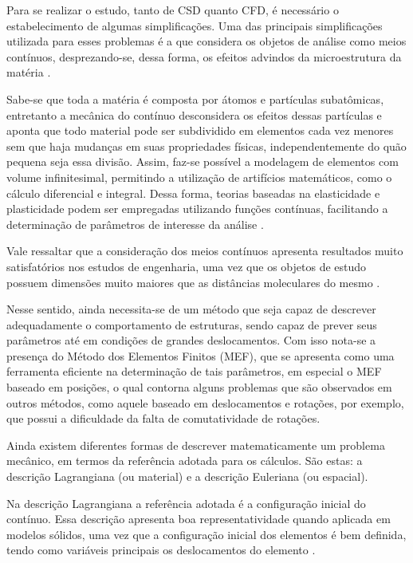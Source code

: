 \documentclass[_ArquivoPrincipal.tex]{subfiles}
\begin{document}
Para se realizar o estudo, tanto de CSD quanto CFD, é necessário o estabelecimento de algumas simplificações. Uma das principais simplificações utilizada para esses problemas é a que considera os objetos de análise como meios contínuos, desprezando-se, dessa forma, os efeitos advindos da microestrutura da matéria \cite{lai2009introduction, mase2009continuum}.

Sabe-se que toda a matéria é composta por átomos e partículas subatômicas, entretanto a mecânica do contínuo desconsidera os efeitos dessas partículas e aponta que todo material pode ser subdividido em elementos cada vez menores sem que haja mudanças em suas propriedades físicas, independentemente do quão pequena seja essa divisão. Assim, faz-se possível a modelagem de elementos com volume infinitesimal, permitindo a utilização de artifícios matemáticos, como o cálculo diferencial e integral. Dessa forma, teorias baseadas na elasticidade e plasticidade podem ser empregadas utilizando funções contínuas, facilitando a determinação de parâmetros de interesse da análise \cite{irgens2008continuum, lai2009introduction, malvern1969introduction}.

Vale ressaltar que a consideração dos meios contínuos apresenta resultados muito satisfatórios nos estudos de engenharia, uma vez que os objetos de estudo possuem dimensões muito maiores que as distâncias moleculares do mesmo \cite{malvern1969introduction, mase2009continuum}.

Nesse sentido, ainda necessita-se de um método que seja capaz de descrever adequadamente o comportamento de estruturas, sendo capaz de prever seus parâmetros até em condições de grandes deslocamentos. Com isso nota-se a presença do Método dos Elementos Finitos (MEF), que se apresenta como uma ferramenta eficiente na determinação de tais parâmetros, em especial o MEF baseado em posições, o qual contorna alguns problemas que são observados em outros métodos, como aquele baseado em deslocamentos e rotações, por exemplo, que possui a dificuldade da falta de comutatividade de rotações.

Ainda existem diferentes formas de descrever matematicamente um problema mecânico, em termos da referência adotada para os cálculos. São estas: a descrição Lagrangiana (ou material) e a descrição Euleriana (ou espacial).

Na descrição Lagrangiana a referência adotada é a configuração inicial do contínuo. Essa descrição apresenta boa representatividade quando aplicada em modelos sólidos, uma vez que a configuração inicial dos elementos é bem definida, tendo como variáveis principais os deslocamentos do elemento \cite{sanches2014fluid, fernandes2019ale}.
\end{document}
